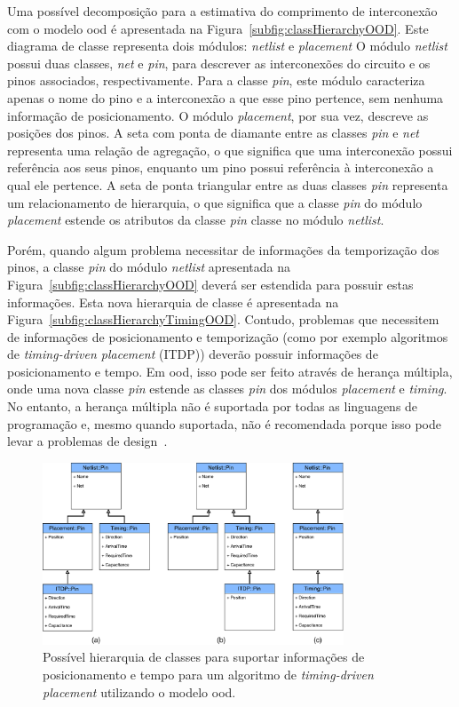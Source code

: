 Uma possível decomposição para a estimativa do comprimento de interconexão com o modelo \ac{ood} é apresentada na Figura~\ref{subfig:classHierarchyOOD}.
Este diagrama de classe representa dois módulos: \textit{netlist} e \textit{placement}
O módulo \textit{netlist} possui duas classes, \textit{net} e \textit{pin}, para descrever as interconexões do circuito e os pinos associados, respectivamente.
Para a classe \textit{pin}, este módulo caracteriza apenas o nome do pino e a interconexão a que esse pino pertence, sem nenhuma informação de posicionamento.
O módulo \textit{placement}, por sua vez, descreve as posições dos pinos.
A seta com ponta de diamante entre as classes \textit{pin} e \textit{net} representa uma relação de agregação, o que significa que uma interconexão possui
referência aos seus pinos, enquanto um pino possui referência à interconexão a qual ele pertence. A seta de ponta triangular entre as duas classes \textit{pin} representa um relacionamento de hierarquia, o que significa que a classe \textit{pin} do módulo \textit{placement} estende os atributos da classe \textit{pin}
classe no módulo \textit{netlist}.

Porém, quando algum problema necessitar de informações da temporização dos pinos, a classe \textit{pin} do módulo \textit{netlist} apresentada na Figura~\ref{subfig:classHierarchyOOD} deverá ser estendida para possuir estas informações. Esta nova hierarquia de classe é apresentada na Figura~\ref{subfig:classHierarchyTimingOOD}.
Contudo, problemas que necessitem de informações de posicionamento e temporização (como por exemplo algoritmos de \textit{timing-driven placement} (ITDP)) deverão possuir informações de posicionamento e tempo.
Em \ac{ood}, isso pode ser feito através de herança múltipla, onde uma nova classe \textit{pin} estende as classes \textit{pin} dos módulos \textit{placement} e \textit{timing}.
No entanto, a herança múltipla não é suportada por todas as linguagens de programação e, mesmo quando suportada, não é recomendada
porque isso pode levar a problemas de design~\cite{nystrom2014game}.

\begin{figure}[h!b]
    \centering
    \includegraphics[width=0.8\textwidth]{img/introducao/ITDPsolutionOOD.pdf}
    \caption[Hierarquia de classes]{Possível hierarquia de classes para suportar informações de posicionamento e tempo para um algoritmo de \textit{timing-driven placement} utilizando o  modelo \ac{ood}.}
    \label{fig:classITDP}
\end{figure}


